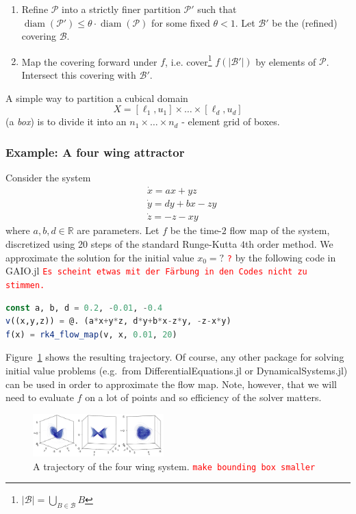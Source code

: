 \documentclass{juliacon}
\newcommand{\R}{{\mathbb R}}
\newcommand{\cB}{\mathcal{B}}
\newcommand{\cP}{\mathcal{P}}
\newcommand{\diam}{\mathop{\mathrm{diam}}}
\newcommand{\todo}[1]{\textcolor{red}{\texttt{#1}}}
\begin{document}
\begin{enumerate}
    \item Refine $\cP$ into a strictly finer partition $\cP'$ such that $\diam (\cP') \leq \theta \cdot \diam (\cP)$ for some fixed $\theta < 1$. Let $\cB'$ be the (refined) covering $\cB$. 
    \item Map the covering forward under $f$, i.e. cover\footnote{$\vert \cB \vert = \bigcup_{B \in \cB} B$} $f(\vert\cB'\vert)$  by elements of $\cP$. Intersect this covering with $\cB'$. 
\end{enumerate}

A simple way to partition a cubical domain $$X = \left[ \ell_1, u_1 \right] \times \ldots \times \left[ \ell_d, u_d \right]$$ (a \emph{box}) is to divide it into an $n_1 \times \ldots \times n_d$ - element grid of boxes. 

\subsubsection*{Example: A four wing attractor}

Consider the system \cite{3dattractor}
\begin{equation}
    \label{eq:ode}
    \begin{split}
        &\dot{x} = ax + yz \\
        &\dot{y} = dy + bx - zy \\ 
        &\dot{z} = -z - xy 
    \end{split}
\end{equation}
where $a,b,d \in \R$ are parameters. Let $f$ be the time-$2$ flow map of the system, discretized using 20 steps of the standard Runge-Kutta $4$th order method. We approximate the solution for the initial value $x_0=?$ \todo{?} by the following code in GAIO.jl
\todo{Es scheint etwas mit der Färbung in den Codes nicht zu stimmen.}
\begin{lstlisting}[language=Julia,label=lst:map,backgroundcolor=\color{white}]
const a, b, d = 0.2, -0.01, -0.4
v((x,y,z)) = @. (a*x+y*z, d*y+b*x-z*y, -z-x*y)
f(x) = rk4_flow_map(v, x, 0.01, 20)
\end{lstlisting}
Figure~\ref{fig:trajectories} shows the resulting trajectory.  Of course, any other package for solving initial value problems (e.g.\ from DifferentialEquations.jl or DynamicalSystems.jl) can be used in order to approximate the flow map. Note, however, that we will need to evaluate $f$ on a lot of points and so efficiency of the solver matters.
\begin{figure}[h]
    \centering
    \includegraphics[width=0.45\textwidth]{trajectories.jpg}
    \caption{A trajectory of the four wing system. \todo{make bounding box smaller}}
    \label{fig:trajectories}
\end{figure}
\end{document}
